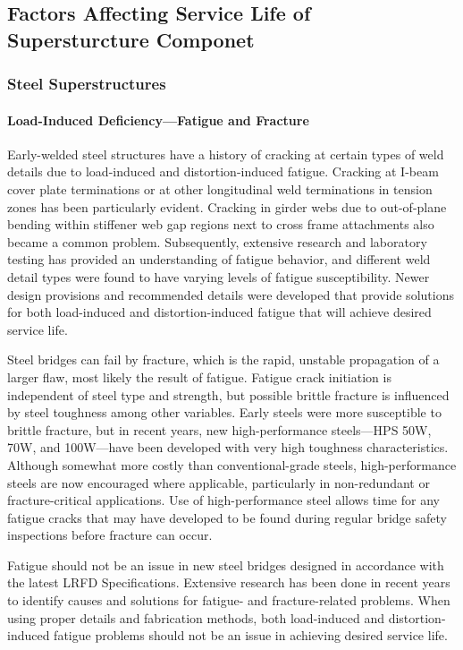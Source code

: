 \subsection{Factors Affecting Service Life of Supersturcture Componet}
\subsubsection{Steel Superstructures}
\paragraph{Load-Induced Deficiency—Fatigue and Fracture}
Early-welded steel structures have a history of cracking at certain types of weld details due to load-induced and
distortion-induced fatigue. Cracking at I-beam cover plate terminations or at other longitudinal weld terminations in
tension zones has been particularly evident. Cracking in girder webs due to out-of-plane bending within stiffener web
gap regions next to cross frame attachments also became a common problem. Subsequently, extensive research and
laboratory testing has provided an understanding of fatigue behavior, and different weld detail types were found to
have varying levels of fatigue susceptibility. Newer design provisions and recommended details were developed that
provide solutions for both load-induced and distortion-induced fatigue that will achieve desired service life.


Steel bridges can fail by fracture, which is the rapid, unstable propagation of a larger flaw, most likely the result
of fatigue. Fatigue crack initiation is independent of steel type and strength, but possible brittle fracture is influenced by steel toughness among other variables. Early steels were more susceptible to brittle fracture, but in recent years,
new high-performance steels—HPS 50W, 70W, and 100W—have been developed with very high toughness
characteristics. Although somewhat more costly than conventional-grade steels, high-performance steels are now
encouraged where applicable, particularly in non-redundant or fracture-critical applications. Use of high-performance
steel allows time for any fatigue cracks that may have developed to be found during regular bridge safety inspections
before fracture can occur.

Fatigue should not be an issue in new steel bridges designed in accordance with the latest LRFD Specifications.
Extensive research has been done in recent years to identify causes and solutions for fatigue- and fracture-related
problems. When using proper details and fabrication methods, both load-induced and distortion-induced fatigue
problems should not be an issue in achieving desired service life.

